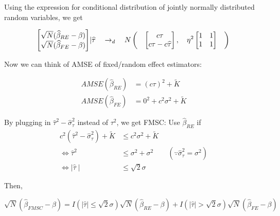 \documentclass[12pt]{article}
\begin{document}
Using the expression for conditional distribution of jointly normally distributed random variables, we get


\[
 \begin{bmatrix}
\sqrt{N} (\widehat{\beta}_{RE} - \beta)\\
\sqrt{N} (\widehat{\beta}_{FE} - \beta)
\end{bmatrix}   \rvert \widehat{\tau} \quad \rightarrow_d \quad  N \left( \quad  \begin{bmatrix}
c\tau \\
c\tau - c\widehat{\tau}\\
\end{bmatrix},  \quad \eta^2\begin{bmatrix}
1&1\\
1&1
\end{bmatrix}  \quad  \right)\\
\]

Now we can think of AMSE of fixed/random effect estimators:

\begin{align*}
AMSE(\widehat{\beta}_{RE}) & = (c\tau)^2 + \widetilde{K}\\
AMSE(\widehat{\beta}_{FE}) & = 0^2 + c^2\sigma^2+\widetilde{K}
\end{align*}

By plugging in $\widehat{\tau}^2 - \widehat{\sigma}_\tau^2$ instead of $\tau^2$, we get FMSC: Use $\widehat{\beta}_{RE}$ if
\begin{align*}
c^2(\widehat{\tau}^2 -\widehat{\sigma}_\tau^2) + \widetilde{K} & \leq c^2 \sigma^2 + \widetilde{K} \\
\Leftrightarrow \widehat{\tau}^2 & \leq \sigma^2 + \sigma^2 \qquad (\because \widehat{\sigma}_\tau^2 = \sigma^2)\\
\Leftrightarrow  \mid \widehat{\tau} \mid &\leq \sqrt{2} \sigma
\end{align*}

Then, 

\[
\sqrt{N}(\widehat{\beta}_{FMSC} - \beta) = I(\mid \widehat{\tau} \mid \leq \sqrt{2} \sigma) \sqrt{N} (\widehat{\beta}_{RE}-\beta) + I(\mid \widehat{\tau} \mid > \sqrt{2} \sigma) \sqrt{N} (\widehat{\beta}_{FE}-\beta)
\]
\end{document}
